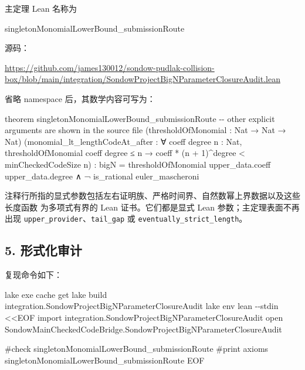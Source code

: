 \documentclass[
  a4paper,
  12pt]{ctexart}
\newenvironment{Shaded}{}{}
\newcommand{\AttributeTok}[1]{\textcolor[rgb]{0.49,0.56,0.16}{#1}}
\newcommand{\ExtensionTok}[1]{#1}
\newcommand{\NormalTok}[1]{#1}
\newcommand{\OperatorTok}[1]{\textcolor[rgb]{0.40,0.40,0.40}{#1}}
\newcommand{\StringTok}[1]{\textcolor[rgb]{0.25,0.44,0.63}{#1}}
\begin{document}
主定理 Lean 名称为

\begin{Shaded}
\begin{Highlighting}[]
\NormalTok{singletonMonomialLowerBound\_submissionRoute}
\end{Highlighting}
\end{Shaded}

源码：

\url{https://github.com/james130012/sondow-pudlak-collision-box/blob/main/integration/SondowProjectBigNParameterClosureAudit.lean}

省略 namespace 后，其数学内容可写为：

\begin{Shaded}
\begin{Highlighting}[]
\NormalTok{theorem singletonMonomialLowerBound\_submissionRoute}
\NormalTok{    {-}{-} other explicit arguments are shown in the source file}
\NormalTok{    (thresholdOfMonomial : Nat → Nat → Nat)}
\NormalTok{    (monomial\_lt\_lengthCodeAt\_after :}
\NormalTok{      ∀ coeff degree n : Nat,}
\NormalTok{        thresholdOfMonomial coeff degree ≤ n →}
\NormalTok{          coeff * (n + 1)\^{}degree \textless{} minCheckedCodeSize n) :}
\NormalTok{    bigN = thresholdOfMonomial upper\_data.coeff upper\_data.degree ∧}
\NormalTok{      ¬ is\_rational euler\_mascheroni}
\end{Highlighting}
\end{Shaded}

注释行所指的显式参数包括左右证明族、严格时间界、自然数幂上界数据以及这些长度函数
为多项式有界的 Lean 证书。它们都是显式 Lean 参数；主定理表面不再出现
\texttt{upper\_provider}、\texttt{tail\_gap} 或
\texttt{eventually\_strict\_length}。

\subsection{5. 形式化审计}\label{ux5f62ux5f0fux5316ux5ba1ux8ba1}

复现命令如下：

\begin{Shaded}
\begin{Highlighting}[]
\ExtensionTok{lake}\NormalTok{ exe cache get}
\ExtensionTok{lake}\NormalTok{ build integration.SondowProjectBigNParameterClosureAudit}
\ExtensionTok{lake}\NormalTok{ env lean }\AttributeTok{{-}{-}stdin} \OperatorTok{\textless{}\textless{}\textquotesingle{}EOF\textquotesingle{}}
\StringTok{import integration.SondowProjectBigNParameterClosureAudit}
\StringTok{open SondowMainCheckedCodeBridge.SondowProjectBigNParameterClosureAudit}

\StringTok{\#check singletonMonomialLowerBound\_submissionRoute}
\StringTok{\#print axioms singletonMonomialLowerBound\_submissionRoute}
\OperatorTok{EOF}
\end{Highlighting}
\end{Shaded}
\end{document}
